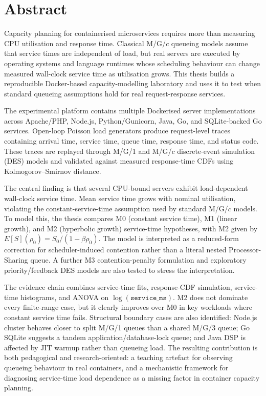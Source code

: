 \chapter*{Abstract}
\label{abstract}

Capacity planning for containerised microservices requires more than measuring CPU utilisation and response time. Classical M/G/$c$ queueing models assume that service times are independent of load, but real servers are executed by operating systems and language runtimes whose scheduling behaviour can change measured wall-clock service time as utilisation grows. This thesis builds a reproducible Docker-based capacity-modelling laboratory and uses it to test when standard queueing assumptions hold for real request-response services.

The experimental platform contains multiple Dockerised server implementations across Apache/PHP, Node.js, Python/Gunicorn, Java, Go, and SQLite-backed Go services. Open-loop Poisson load generators produce request-level traces containing arrival time, service time, queue time, response time, and status code. These traces are replayed through M/G/1 and M/G/$c$ discrete-event simulation (DES) models and validated against measured response-time CDFs using Kolmogorov--Smirnov distance.

The central finding is that several CPU-bound servers exhibit load-dependent wall-clock service time. Mean service time grows with nominal utilisation, violating the constant-service-time assumption used by standard M/G/$c$ models. To model this, the thesis compares M0 (constant service time), M1 (linear growth), and M2 (hyperbolic growth) service-time hypotheses, with M2 given by $E[S](\rho_0)=S_0/(1-\beta\rho_0)$. The model is interpreted as a reduced-form correction for scheduler-induced contention rather than a literal nested Processor-Sharing queue. A further M3 contention-penalty formulation and exploratory priority/feedback DES models are also tested to stress the interpretation.

The evidence chain combines service-time fits, response-CDF simulation, service-time histograms, and ANOVA on $\log(\texttt{service\_ms})$. M2 does not dominate every finite-range case, but it clearly improves over M0 in key workloads where constant service time fails. Structural boundary cases are also identified: Node.js cluster behaves closer to split M/G/1 queues than a shared M/G/3 queue; Go SQLite suggests a tandem application/database-lock queue; and Java DSP is affected by JIT warmup rather than queueing load. The resulting contribution is both pedagogical and research-oriented: a teaching artefact for observing queueing behaviour in real containers, and a mechanistic framework for diagnosing service-time load dependence as a missing factor in container capacity planning.
